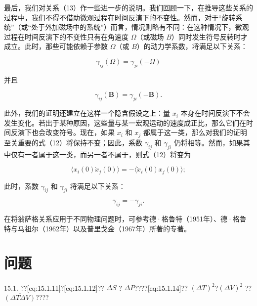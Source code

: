 最后，我们对关系（13）作一些进一步的说明。我们回顾一下，在推导这些关系的过程中，我们不得不借助微观过程在时间反演下的不变性。然而，对于``旋转系统''（或``处于外加磁场中的系统''）而言，情况则略有不同：在这种情况下，微观过程在时间反演下的不变性只有在角速度 \(\Omega\)（或磁场 \(B\)）同时发生符号反转时才成立。此时，那些可能依赖于参数 \(\Omega\)（或 \(B\)）的动力学系数，将满足以下关系：

\begin{equation}\tag{15.6.58}\label{eq:15.6.58}
\gamma _ { i j } ( \Omega ) = \gamma _ { j i } ( - \Omega )
\end{equation}

并且

\begin{equation}\tag{15.6.59}\label{eq:15.6.59}
\gamma _ { i j } ( \pmb { B } ) = \gamma _ { j i } ( - \pmb { B } ) .
\end{equation}

此外，我们的证明还建立在这样一个隐含假设之上：量 \(x_{i}\) 本身在时间反演下不会发生变化。若出于某种原因，这些量与某一宏观运动的速度成正比，那么它们在时间反演下也会改变符号。现在，如果 \(x_{i}\) 和 \(x_{j}\) 都属于这一类，那么对我们的证明至关重要的式（12）将保持不变；因此，系数 \(\gamma_{ij}\) 和 \(\gamma_{ji}\) 仍将相等。然而，如果其中仅有一者属于这一类，而另一者不属于，则式（12）将变为

\begin{equation}\tag{15.6.60}\label{eq:15.6.60}
\langle x _ { i } ( 0 ) \dot { x } _ { j } ( 0 ) \rangle = - \langle \dot { x } _ { i } ( 0 ) x _ { j } ( 0 ) \rangle ;
\end{equation}

此时，系数 \(\gamma_{ij}\) 和 \(\gamma_{ji}\) 将满足以下关系：

\begin{equation}\tag{15.6.61}\label{eq:15.6.61}
\gamma _ { i j } = - \gamma _ { j i } .
\end{equation}

在将翁萨格关系应用于不同物理问题时，可参考德·格鲁特（1951年）、德·格鲁特与马祖尔（1962年）以及普里戈金（1967年）所著的专著。

\section{问题}\label{ux95eeux9898_chap15}

15.1. ??\autoref{eq:15.1.11}?\autoref{eq:15.1.12}?? \(\Delta S\) ? \(\Delta P\)????\autoref{eq:15.1.14}?? \(\overline{(\Delta T)^2}\)?\(\overline{(\Delta V)^2}\) ?? \(\overline{(\Delta T\Delta V)}\)????

